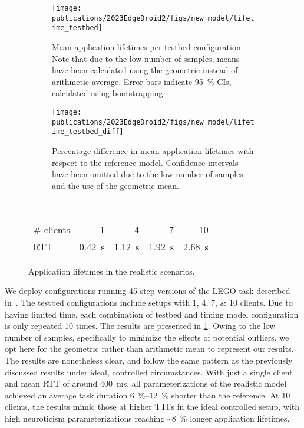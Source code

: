 \begin{figure}
    \centering
    \begin{subfigure}[t]{.45\textwidth}
        \centering
        \texttt{[image: publications/2023EdgeDroid2/figs/new\_model/lifetime\_testbed]}
        \caption{%
            Mean application lifetimes per testbed configuration.
            Note that due to the low number of samples, means have been calculated using the geometric instead of arithmetic average. 
            Error bars indicate \SI{95}{\percent} \glspl{CI}, calculated using bootstrapping.
        }
    \end{subfigure}%
    \hfill%
    \begin{subfigure}[t]{.45\textwidth}
        \centering
        \texttt{[image: publications/2023EdgeDroid2/figs/new\_model/lifetime\_testbed\_diff]}
        \caption{%
            Percentage difference in mean application lifetimes with respect to the reference model.
            Confidence intervals have been omitted due to the low number of samples and the use of the geometric mean.
        }
    \end{subfigure}\\
    \bigskip
    \begin{subtable}{\textwidth}
        \centering
        \begin{tabular}{lrrrr}
            \toprule
            \# clients & 1 & 4 & 7 & 10 \\
            \gls{RTT} & \SI{0.42}{\second} & \SI{1.12}{\second} & \SI{1.92}{\second} & \SI{2.68}{\second} \\
            \bottomrule
        \end{tabular}
        \caption{Mean measured \glspl{RTT} for each testbed configuration.}
    \end{subtable}
    \caption{Application lifetimes in the realistic scenarios.}\label{fig:testbed_lifetimes}
\end{figure}

We deploy configurations running \num{45}-step versions of the LEGO task described in~\cite{olguinmunoz2021impact}.
The testbed configurations include setups with \numlist{1;4;7;10} clients.
Due to having limited time, each combination of testbed and timing model configuration is only repeated \num{10} times.
The results are presented in \cref{fig:testbed_lifetimes}.
Owing to the low number of samples, specifically to minimize the effects of potential outliers, we opt here for the geometric rather than arithmetic mean to represent our results.
The results are nonetheless clear, and follow the same pattern as the previously discussed results under ideal, controlled circumstances.
With just a single client and mean \gls{RTT} of around \SI{400}{\milli\second}, all parameterizations of the realistic model achieved an average task duration \SIrange{6}{12}{\percent} shorter than the reference.
At \num{10} clients, the results mimic those at higher \glspl{TTF} in the ideal controlled setup, with high neuroticism parameterizations reaching \textasciitilde\SI{8}{\percent} longer application lifetimes.

